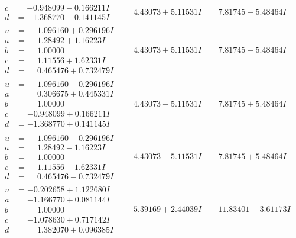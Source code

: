 \documentclass[1p]{elsarticle_modified}
\theoremstyle{definition}
\begin{document}
$$\begin{array}{c|c|c}
\begin{aligned}
c &= -0.948099 - 0.166211 I \\
d &= -1.368770 - 0.141145 I\end{aligned}
 & \phantom{-}4.43073 + 5.11531 I & \phantom{-}7.81745 - 5.48464 I \\ \hline\begin{aligned}
u &= \phantom{-}1.096160 + 0.296196 I \\
a &= \phantom{-}1.28492 + 1.16223 I \\
b &= \phantom{-}1.00000\phantom{ +0.000000I} \\
c &= \phantom{-}1.11556 + 1.62331 I \\
d &= \phantom{-}0.465476 + 0.732479 I\end{aligned}
 & \phantom{-}4.43073 + 5.11531 I & \phantom{-}7.81745 - 5.48464 I \\ \hline\begin{aligned}
u &= \phantom{-}1.096160 - 0.296196 I \\
a &= \phantom{-}0.306675 + 0.445331 I \\
b &= \phantom{-}1.00000\phantom{ +0.000000I} \\
c &= -0.948099 + 0.166211 I \\
d &= -1.368770 + 0.141145 I\end{aligned}
 & \phantom{-}4.43073 - 5.11531 I & \phantom{-}7.81745 + 5.48464 I \\ \hline\begin{aligned}
u &= \phantom{-}1.096160 - 0.296196 I \\
a &= \phantom{-}1.28492 - 1.16223 I \\
b &= \phantom{-}1.00000\phantom{ +0.000000I} \\
c &= \phantom{-}1.11556 - 1.62331 I \\
d &= \phantom{-}0.465476 - 0.732479 I\end{aligned}
 & \phantom{-}4.43073 - 5.11531 I & \phantom{-}7.81745 + 5.48464 I \\ \hline\begin{aligned}
u &= -0.202658 + 1.122680 I \\
a &= -1.166770 + 0.081144 I \\
b &= \phantom{-}1.00000\phantom{ +0.000000I} \\
c &= -1.078630 + 0.717142 I \\
d &= \phantom{-}1.382070 + 0.096385 I\end{aligned}
 & \phantom{-}5.39169 + 2.44039 I & \phantom{-}11.83401 - 3.61173 I \\ \hline\begin{aligned}

\end{aligned}
\end{array}$$
\end{document}
